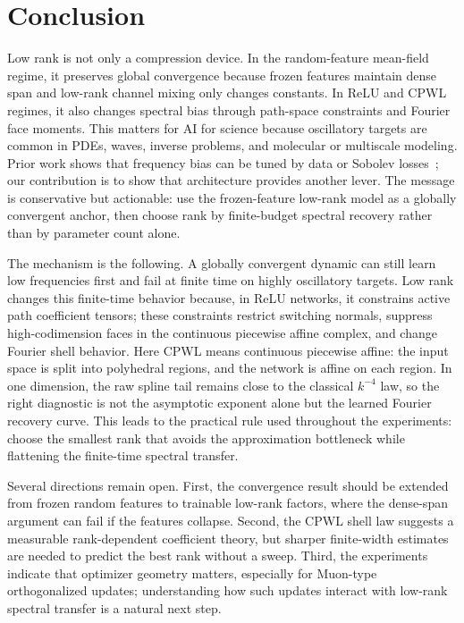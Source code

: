 \documentclass{article}
\begin{document}
\FloatBarrier

\section{Conclusion}

Low rank is not only a compression device. In the random-feature mean-field regime, it preserves global convergence because frozen features maintain dense span and low-rank channel mixing only changes constants. In ReLU and CPWL regimes, it also changes spectral bias through path-space constraints and Fourier face moments. This matters for AI for science because oscillatory targets are common in PDEs, waves, inverse problems, and molecular or multiscale modeling. Prior work shows that frequency bias can be tuned by data or Sobolev losses~\cite{yu2022tuning}; our contribution is to show that architecture provides another lever. The message is conservative but actionable: use the frozen-feature low-rank model as a globally convergent anchor, then choose rank by finite-budget spectral recovery rather than by parameter count alone.

The mechanism is the following. A globally convergent dynamic can still learn low frequencies first and fail at finite time on highly oscillatory targets. Low rank changes this finite-time behavior because, in ReLU networks, it constrains active path coefficient tensors; these constraints restrict switching normals, suppress high-codimension faces in the continuous piecewise affine complex, and change Fourier shell behavior. Here CPWL means continuous piecewise affine: the input space is split into polyhedral regions, and the network is affine on each region. In one dimension, the raw spline tail remains close to the classical $k^{-4}$ law, so the right diagnostic is not the asymptotic exponent alone but the learned Fourier recovery curve. This leads to the practical rule used throughout the experiments: choose the smallest rank that avoids the approximation bottleneck while flattening the finite-time spectral transfer.

Several directions remain open. First, the convergence result should be extended from frozen random features to trainable low-rank factors, where the dense-span argument can fail if the features collapse. Second, the CPWL shell law suggests a measurable rank-dependent coefficient theory, but sharper finite-width estimates are needed to predict the best rank without a sweep. Third, the experiments indicate that optimizer geometry matters, especially for Muon-type orthogonalized updates; understanding how such updates interact with low-rank spectral transfer is a natural next step.
\end{document}
